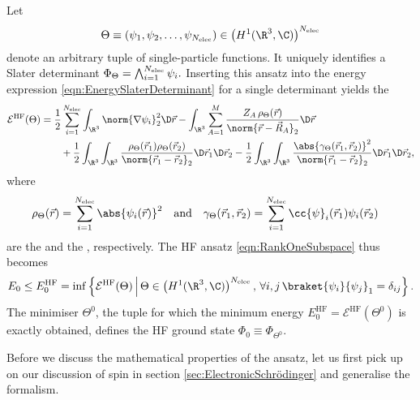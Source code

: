 \begin{rem}
	Let
	\[  \Theta \equiv \left(\psi_1, \psi_2, \ldots, \psi_{\Nelec}\right)
		\in \left(H^1(\R^3, \C)\right)^{\Nelec} \]
	denote an arbitrary tuple of single-particle functions.
	It uniquely identifies a Slater determinant
	$\Phi_\Theta = \bigwedge_{i=1}^{N_\text{elec}} \psi_i.$
	Inserting this ansatz into the energy expression
	\eqref{eqn:EnergySlaterDeterminant} for a single determinant
	yields the 
	\begin{equation}
		\begin{aligned}
		\mathcal{E}^\text{HF}(\Theta)
		&= \frac12 \sum_{i=1}^{\Nelec} \int_{\R^3} \norm{\nabla \psi_i}_2^2 \D\vec{r}
		- \int_{\R^3} \sum_{A=1}^M
			\frac{Z_A \, \rho_\Theta(\vec{r})}{\norm{\vec{r} - \vec{R}_A}_2} \D\vec{r} \\
		&\hspace{20pt}
		+ \frac12 \int_{\R^3}\int_{\R^3}
			\frac{\rho_\Theta(\vec{r}_1) \rho_\Theta(\vec{r}_2)}
				{\norm{\vec{r}_1 - \vec{r}_2}_2} \D\vec{r}_1 \D\vec{r}_2
		- \frac12 \int_{\R^3}\int_{\R^3}
			\frac{\abs{\gamma_\Theta(\vec{r}_1, \vec{r}_2)}^2}
				{\norm{\vec{r}_1 - \vec{r}_2}_2} \D\vec{r}_1 \D\vec{r}_2,
		\end{aligned}
		\label{eqn:HFEnergyFunctional}
	\end{equation}
	where
	\begin{align}
		\label{eqn:HFDensityNoSpin}
		\rho_\Theta(\vec{r}) &= \sum_{i=1}^{\Nelec} \abs{\psi_i(\vec{r})}^2
		&\text{and} &&
		\gamma_\Theta(\vec{r}_1,\vec{r}_2)
			&= \sum_{i=1}^{\Nelec} \cc{\psi}_i(\vec{r}_1) \psi_i(\vec{r}_2)
	\end{align}
	are the 
	and the , respectively.
	The HF ansatz \eqref{eqn:RankOneSubspace}
	thus becomes
	\begin{equation}
		E_0 \leq E_0^\text{HF}
		= \inf \left\{
			\mathcal{E}^\text{HF}(\Theta)
			\, \middle| \,
			\Theta \in \left(H^1(\R^3, \C)\right)^{\Nelec}, \,
			\forall i,j \,
			\braket{\psi_i}{\psi_j}_1 = \delta_{ij}
		\right\}.
		\label{eqn:HFMO}
	\end{equation}
	The minimiser $\Theta^0$, \ie the tuple for which the minimum
	energy $E_0^\text{HF} = \mathcal{E}^\text{HF}(\Theta^0)$
	is exactly obtained,
	defines the HF ground state
	$\Phi_0 \equiv \Phi_{\Theta^0}$.
\end{rem}

Before we discuss the mathematical properties of the \HF ansatz,
let us first pick up on our discussion
of spin in section \vref{sec:ElectronicSchrödinger}
and generalise the formalism.

